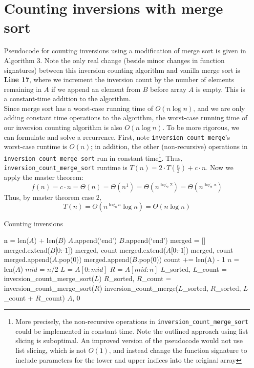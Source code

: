 \documentclass[paper=a4, fontsize=11pt]{scrartcl} %
\numberwithin{equation}{section} %
\numberwithin{figure}{section} %
\numberwithin{table}{section} %
\begin{document}
\section{Counting inversions with merge sort}

Pseudocode for counting inversions using a modification of merge sort is given in Algorithm 3. Note the only real change (beside minor changes in function signatures) between this inversion counting algorithm and vanilla merge sort is \textbf{Line 17}, where we increment the inversion count by the number of elements remaining in $A$ if we append an element from $B$ before array $A$ is empty. This is a constant-time addition to the algorithm. \\

Since merge sort has a worst-case running time of $O(n \log n)$, and we are only adding constant time operations to the algorithm, the worst-case running time of our inversion counting algorithm is also $O(n \log n)$. To be more rigorous, we can formulate and solve a recurrence. First, note \texttt{inversion\_count\_merge}'s worst-case runtime is $O(n)$; in addition, the other (non-recursive) operations in \texttt{inversion\_count\_merge\_sort} run in constant time\footnote{More precisely, the non-recursive operations in \texttt{inversion\_count\_merge\_sort} could be implemented in constant time. Note the outlined approach using list slicing is suboptimal. An improved version of the pseudocode would not use list slicing, which is not $O(1)$, and instead change the function signature to include parameters for the lower and upper indices into the original array}. Thus, \texttt{inversion\_count\_merge\_sort} runtime is $T(n) = 2\cdot T\left(\frac{n}{2}\right) + c\cdot n$. Now we apply the master theorem:
\[f(n) = c\cdot n =  \Theta(n) =  \Theta(n^1) = \Theta(n^{\log_2 2}) = \Theta(n^{\log_b a})\]
Thus, by master theorem case 2,
\[T(n) = \Theta(n^{\log_b a}\log n) = \Theta(n \log n)\]


\begin{algorithm}\small
\caption{Counting inversions}
\label{itbs}
\begin{algorithmic}[1]
	\State n = len($A$) + len($B$)
	\State $A$.append(`end')
	\State $B$.append(`end')
	\State merged = []
			\State merged.extend($B$[0:-1])
			\State \Return merged, count
			\State merged.extend($A$[0:-1])
			\State \Return merged, count
			\State merged.append($A$.pop(0))
		\Else
			\State merged.append($B$.pop(0))
			\State count += len(A) - 1
		\EndIf
	\EndFor
\EndFunction
{}	
		\State $n$ = len($A$)
		\State $mid$ = $n$/2
		\State $L$ = $A[0:mid]$
		\State $R$ = $A[mid:n]$
		\State $L$\_sorted, $L$\_count = inversion\_count\_merge\_sort($L$)
		\State $R$\_sorted, $R$\_count = inversion\_count\_merge\_sort($R$)
		\State \Return inversion\_count\_merge($L$\_sorted, $R$\_sorted, $L$\_count + $R$\_count)
	\Else
		\State \Return $A$, 0
	\EndIf
\EndFunction
\end{algorithmic}
\end{algorithm}
\end{document}
